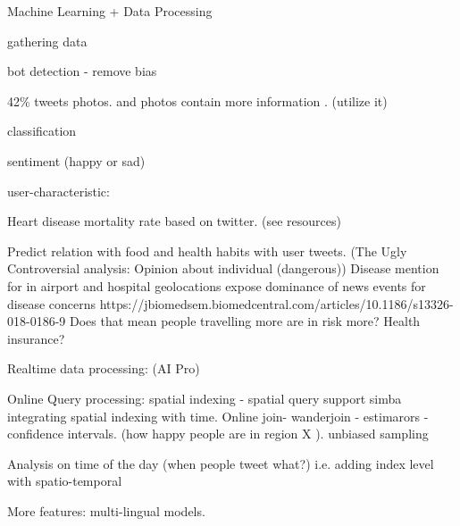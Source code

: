
Machine Learning  +  Data Processing

gathering data

bot detection - remove bias


42\% tweets photos. and photos contain more information . (utilize it)

classification

sentiment (happy or sad)

user-characteristic:

Heart disease mortality rate based on twitter. (see resources)

Predict relation with food and health habits with user tweets. (The Ugly Controversial analysis: Opinion about individual (dangerous))
  Disease mention for
  in airport and hospital geolocations expose dominance of news events for disease concerns
  https://jbiomedsem.biomedcentral.com/articles/10.1186/s13326-018-0186-9
  Does that mean people travelling more are in risk more? Health insurance?


Realtime data processing:  (AI Pro)

Online Query processing:
  spatial indexing - spatial query support simba
  integrating spatial indexing with time.
  Online join- wanderjoin - estimarors - confidence intervals. (how happy people  are in region X ).
  unbiased sampling

  Analysis on time of the day  (when people tweet what?) i.e. adding index level with spatio-temporal


More features:
multi-lingual models.


